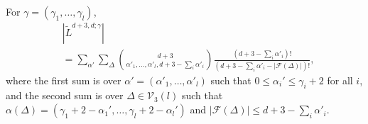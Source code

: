 \documentclass{wstmp}
\begin{document}
\begin{proposition}
\label{prop:discriminantal-type}
For $\gamma=(\gamma_1,\ldots,\gamma_l)$,
\begin{align}
&{\left|{\tilde L^{d+3,d;\gamma}}\right|}
\nonumber\\
& =
\sum_{\alpha'}
\sum_{\Delta }
\binom{d+3}{\alpha'_1,\ldots,\alpha'_l, d+3-\sum_i\alpha'_i}
\frac{(d+3-\sum_i\alpha'_i) !}{ (d+3-\sum_i\alpha'_i-{\left|{{\mathcal{F}}(\Delta)}\right|})!},
\label{eq:discriminantal-type}
\end{align}
where 
the first sum is over $\alpha'=(\alpha'_1,\ldots,\alpha'_l)$
such that
 $0\leq \alpha_i' \leq \gamma_i+2$ for all $i$,
and the second sum is over 
$\Delta \in  {\mathcal{V}}_3(l)$
such that 
 $\alpha(\Delta)= (\gamma_1+2-\alpha_1',\ldots,\gamma_l+2-\alpha_l')$
and ${\left|{{\mathcal{F}}(\Delta)}\right|}\leq d+3 -\sum_i \alpha'_i$.
\end{proposition}
\end{document}
